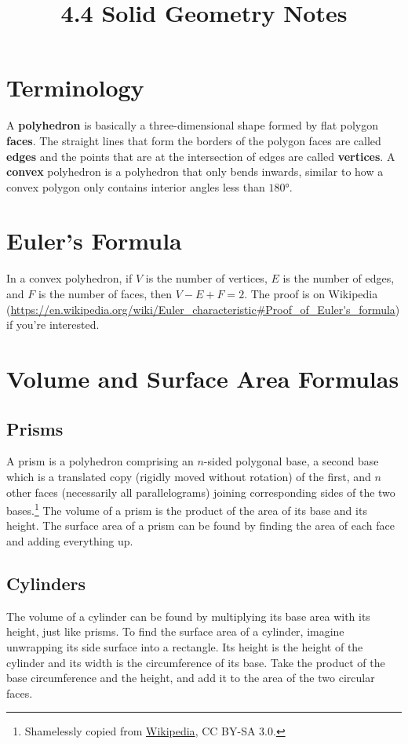 \documentclass{article}
\title{4.4 Solid Geometry Notes}
\author{}
\date{}
\begin{document}
\maketitle
\begin{multicols}{2}
	\section*{Terminology}
	A \textbf{polyhedron} is basically a three-dimensional shape formed by flat polygon \textbf{faces}.
	The straight lines that form the borders of the polygon faces are called \textbf{edges} and the points that are at the intersection of edges are called \textbf{vertices}.
	A \textbf{convex} polyhedron is a polyhedron that only bends inwards, similar to how a convex polygon only contains interior angles less than $\ang{180}$.

	\section*{Euler's Formula}
	In a convex polyhedron, if $V$ is the number of vertices, $E$ is the number of edges, and $F$ is the number of faces, then $V - E + F = 2$.
	The proof is on Wikipedia (\url{https://en.wikipedia.org/wiki/Euler_characteristic#Proof_of_Euler's_formula}) if you're interested.
	
	\section*{Volume and Surface Area Formulas}
	\subsection*{Prisms}
	A prism is a polyhedron comprising an $n$-sided polygonal base, a second base which is a translated copy (rigidly moved without rotation) of the first, and $n$ other faces (necessarily all parallelograms) joining corresponding sides of the two bases.\footnote{Shamelessly copied from \href{https://en.wikipedia.org/wiki/Prism_(geometry)}{Wikipedia}, CC BY-SA 3.0.}
	The volume of a prism is the product of the area of its base and its height.
	The surface area of a prism can be found by finding the area of each face and adding everything up.

	\subsection*{Cylinders}
	The volume of a cylinder can be found by multiplying its base area with its height, just like prisms.
	To find the surface area of a cylinder, imagine unwrapping its side surface into a rectangle.
	Its height is the height of the cylinder and its width is the circumference of its base.
	Take the product of the base circumference and the height, and add it to the area of the two circular faces.


\end{multicols}
\end{document}
